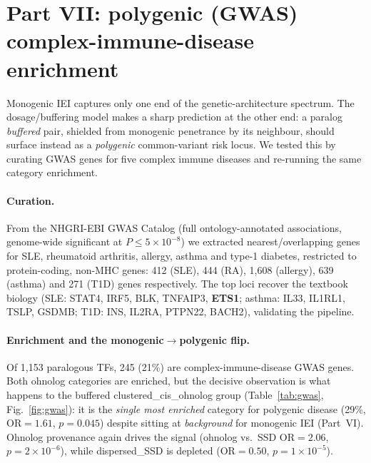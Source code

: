 \documentclass[11pt]{article}
\newcommand{\clusoh}{\textcolor{ohnolog}{clustered\_cis\_ohnolog}}
\newcommand{\dispssd}{\textcolor{ssd}{dispersed\_SSD}}
\begin{document}
\section{Part VII: polygenic (GWAS) complex-immune-disease enrichment}

Monogenic IEI captures only one end of the genetic-architecture spectrum. The dosage/buffering
model makes a sharp prediction at the other end: a paralog \emph{buffered} pair, shielded from
monogenic penetrance by its neighbour, should surface instead as a \emph{polygenic} common-variant
risk locus. We tested this by curating GWAS genes for five complex immune diseases and re-running
the same category enrichment.

\paragraph{Curation.} From the NHGRI-EBI GWAS Catalog (full ontology-annotated associations,
genome-wide significant at $P\le5\times10^{-8}$) we extracted nearest/overlapping genes for SLE,
rheumatoid arthritis, allergy, asthma and type-1 diabetes, restricted to protein-coding,
non-MHC genes: 412 (SLE), 444 (RA), 1{,}608 (allergy), 639 (asthma) and 271 (T1D) genes
respectively. The top loci recover the textbook biology (SLE: STAT4, IRF5, BLK, TNFAIP3,
\textbf{ETS1}; asthma: IL33, IL1RL1, TSLP, GSDMB; T1D: INS, IL2RA, PTPN22, BACH2), validating
the pipeline.

\paragraph{Enrichment and the monogenic$\to$polygenic flip.} Of 1{,}153 paralogous TFs, 245
(21\%) are complex-immune-disease GWAS genes. Both ohnolog categories are enriched, but the
decisive observation is what happens to the buffered \clusoh{} group
(Table~\ref{tab:gwas}, Fig.~\ref{fig:gwas}): it is the \emph{single most enriched} category for
polygenic disease (29\%, OR$=1.61$, $p=0.045$) despite sitting at \emph{background} for
monogenic IEI (Part~VI). Ohnolog provenance again drives the signal (ohnolog vs.\ SSD OR$=2.06$,
$p=2\times10^{-6}$), while \dispssd{} is depleted (OR$=0.50$, $p=1\times10^{-5}$).
\end{document}
